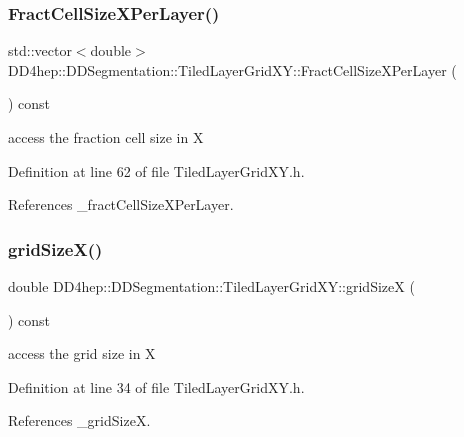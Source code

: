 \subsubsection{\texorpdfstring{Fract\+Cell\+Size\+X\+Per\+Layer()}{FractCellSizeXPerLayer()}}
{\footnotesize\ttfamily std\+::vector$<$double$>$ D\+D4hep\+::\+D\+D\+Segmentation\+::\+Tiled\+Layer\+Grid\+X\+Y\+::\+Fract\+Cell\+Size\+X\+Per\+Layer (\begin{DoxyParamCaption}{ }\end{DoxyParamCaption}) const\hspace{0.3cm}{\ttfamily [inline]}}



access the fraction cell size in X 



Definition at line 62 of file Tiled\+Layer\+Grid\+X\+Y.\+h.



References \+\_\+fract\+Cell\+Size\+X\+Per\+Layer.

\hypertarget{class_d_d4hep_1_1_d_d_segmentation_1_1_tiled_layer_grid_x_y_aa38b5a15a0635685432d039eca235d99}{}\label{class_d_d4hep_1_1_d_d_segmentation_1_1_tiled_layer_grid_x_y_aa38b5a15a0635685432d039eca235d99} 
\subsubsection{\texorpdfstring{grid\+Size\+X()}{gridSizeX()}}
{\footnotesize\ttfamily double D\+D4hep\+::\+D\+D\+Segmentation\+::\+Tiled\+Layer\+Grid\+X\+Y\+::grid\+SizeX (\begin{DoxyParamCaption}{ }\end{DoxyParamCaption}) const\hspace{0.3cm}{\ttfamily [inline]}}



access the grid size in X 



Definition at line 34 of file Tiled\+Layer\+Grid\+X\+Y.\+h.



References \+\_\+grid\+SizeX.

\hypertarget{class_d_d4hep_1_1_d_d_segmentation_1_1_tiled_layer_grid_x_y_a6f66ec3fe4dc396a168cbc17df35935f}{}\label{class_d_d4hep_1_1_d_d_segmentation_1_1_tiled_layer_grid_x_y_a6f66ec3fe4dc396a168cbc17df35935f} 
